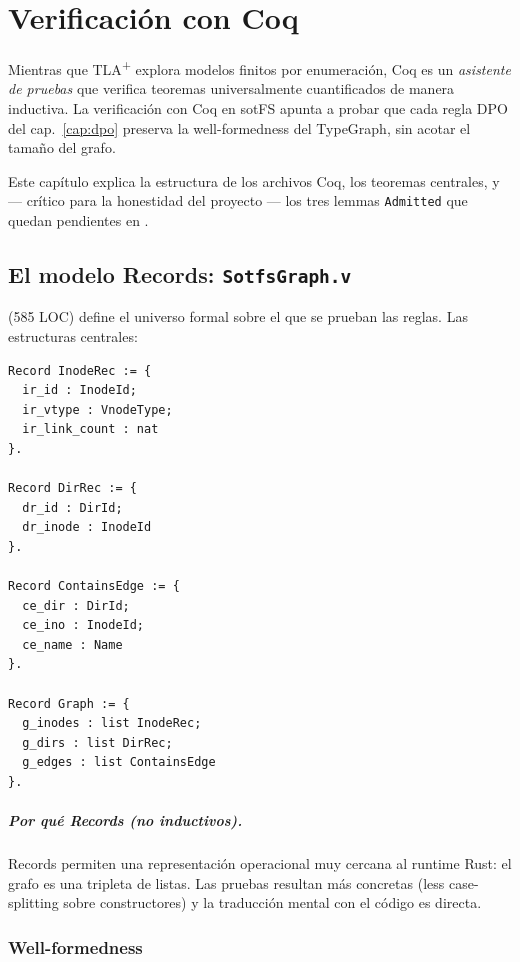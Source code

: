 \chapter{Verificación con Coq}
\label{cap:coq}

Mientras que TLA\textsuperscript{+} explora modelos finitos por
enumeración, Coq es un \emph{asistente de pruebas} que verifica
teoremas universalmente cuantificados de manera inductiva. La
verificación con Coq en sotFS apunta a probar que cada regla DPO del
cap.~\ref{cap:dpo} preserva la well-formedness del TypeGraph, sin
acotar el tamaño del grafo.

Este capítulo explica la estructura de los archivos Coq, los teoremas
centrales, y --- crítico para la honestidad del proyecto --- los tres
lemmas \texttt{Admitted} que quedan pendientes en .

\section{El modelo Records: \texttt{SotfsGraph.v}}

 (585 LOC) define el universo formal sobre el
que se prueban las reglas. Las estructuras centrales:

\begin{lstlisting}[language=coq, caption={Records principales en
\texttt{SotfsGraph.v}.}, label={lst:coq-records}]
Record InodeRec := {
  ir_id : InodeId;
  ir_vtype : VnodeType;
  ir_link_count : nat
}.

Record DirRec := {
  dr_id : DirId;
  dr_inode : InodeId
}.

Record ContainsEdge := {
  ce_dir : DirId;
  ce_ino : InodeId;
  ce_name : Name
}.

Record Graph := {
  g_inodes : list InodeRec;
  g_dirs : list DirRec;
  g_edges : list ContainsEdge
}.
\end{lstlisting}

\paragraph{Por qué Records (no inductivos).} Records permiten una
representación operacional muy cercana al runtime Rust: el grafo es
una tripleta de listas. Las pruebas resultan más concretas (less
case-splitting sobre constructores) y la traducción mental con el
código es directa.

\subsection*{Well-formedness}

